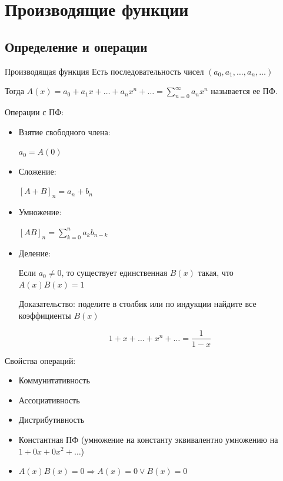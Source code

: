 \section{Производящие функции}

\subsection{Определение и операции}

\begin{defn}{Производящая функция}{}
    Есть последовательность чисел \( (a_0, a_1, \ldots, a_n, \ldots) \)

    Тогда \( A(x) = a_0 + a_1 x + \ldots + a_n x^n + \ldots = \sum\limits_{n = 0}^{\infty} a_n x^n \) называется ее ПФ.
\end{defn}

Операции с ПФ:
\begin{itemize}
    \item
        Взятие свободного члена:

        \( a_0 = A(0) \)
    \item
        Сложение:

        \( [A + B]_n = a_n + b_n \)
    \item
        Умножение:

        \( [AB]_n = \sum\limits_{k = 0}^{n} a_k b_{n - k} \)
    \item
        Деление:

        \begin{lemma}{}{}
            Если \( a_0 \neq 0 \),
            то существует единственная \( B(x) \) такая,
            что \( A(x) B(x) = 1 \)
        \end{lemma}

        Доказательство: поделите в столбик или по индукции найдите все коэффициенты \( B(x) \)

        \begin{example}{}{}
            \[
                1 + x + \ldots + x^n + \ldots = \frac{1}{1 - x}
            \]
        \end{example}
\end{itemize}

Свойства операций:
\begin{itemize}
    \item Коммунитативность
    \item Ассоциативность
    \item Дистрибутивность
    \item Константная ПФ (умножение на константу эквивалентно умножению на \(1 + 0x + 0x^2 + \ldots \))
    \item \( A(x)B(x) = 0 \Rightarrow A(x) = 0 \lor B(x) = 0 \)
\end{itemize}

